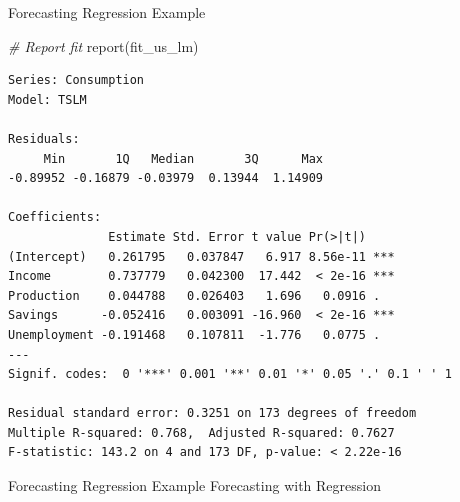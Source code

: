 \documentclass[
  ignorenonframetext,
]{beamer}
\newenvironment{Shaded}{\begin{snugshade}}{\end{snugshade}}
\newcommand{\CommentTok}[1]{\textcolor[rgb]{0.56,0.35,0.01}{\textit{#1}}}
\newcommand{\FunctionTok}[1]{\textcolor[rgb]{0.00,0.00,0.00}{#1}}
\newcommand{\NormalTok}[1]{#1}
\begin{document}
\begin{frame}[fragile]{Forecasting \textbar{} \small Regression Example}
\protect\hypertarget{forecasting-regression-example-3}{}
\tiny

\normalfont

\tiny

\begin{Shaded}
\begin{Highlighting}[]
\CommentTok{\# Report fit}
\FunctionTok{report}\NormalTok{(fit\_us\_lm)}
\end{Highlighting}
\end{Shaded}

\begin{verbatim}
Series: Consumption 
Model: TSLM 

Residuals:
     Min       1Q   Median       3Q      Max 
-0.89952 -0.16879 -0.03979  0.13944  1.14909 

Coefficients:
              Estimate Std. Error t value Pr(>|t|)    
(Intercept)   0.261795   0.037847   6.917 8.56e-11 ***
Income        0.737779   0.042300  17.442  < 2e-16 ***
Production    0.044788   0.026403   1.696   0.0916 .  
Savings      -0.052416   0.003091 -16.960  < 2e-16 ***
Unemployment -0.191468   0.107811  -1.776   0.0775 .  
---
Signif. codes:  0 '***' 0.001 '**' 0.01 '*' 0.05 '.' 0.1 ' ' 1

Residual standard error: 0.3251 on 173 degrees of freedom
Multiple R-squared: 0.768,  Adjusted R-squared: 0.7627
F-statistic: 143.2 on 4 and 173 DF, p-value: < 2.22e-16
\end{verbatim}

\normalfont
\end{frame}

\begin{frame}{Forecasting \textbar{} \small Regression Example}
\protect\hypertarget{forecasting-regression-example-4}{}
\center Forecasting with Regression
\end{frame}
\end{document}
